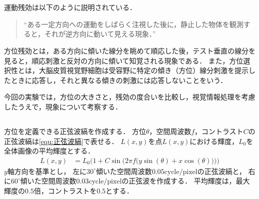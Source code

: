 \chapter{\kadaic}
\section{\purpose}
運動残効は以下のように説明されている．
\begin{quote}
    ``ある一定方向への運動をしばらく注視した後に，静止した物体を観測すると，それが逆方向に動いて見える現象．''\\
    \hfill\cite[p.58]{認知心理学辞典}
\end{quote}
方位残効とは，ある方向に傾いた線分を眺めて順応した後，テスト垂直の線分を見ると，順応刺激と反対の方向に傾いて知覚される現象である\cite[p.5]{方位残効と運動残効のメカニズム}．
また，方位選択性とは，大脳皮質視覚野細胞は受容野に特定の傾き（方位）線分刺激を提示したときに応答し，それと異なる傾きの刺激には応答しないことをいう\cite[p.764]{認知心理学辞典}．\par
今回の実験では，方位の大きさと，残効の度合いを比較し，視覚情報処理を考慮したうえで，現象について考察する．
\section{\method}
\paragraph{\kadaica}
方位を定義できる正弦波縞を作成する．
方位\(\theta\)，空間周波数\(f\)，コントラスト\(C\)の正弦波縞は\eqref{equ:正弦波縞}で表せる．
\(L(x,y)\)を点\(L(x,y)\)における輝度，\(L_0\)を全体画像の平均輝度とする．
\begin{align}
    L(x,y) & = L_0\Bigg(1+C\sin\Big(2\pi f\big(y\sin(\theta)+x\cos(\theta)\big)\Big)\Bigg)\label{equ:正弦波縞}
\end{align}
\(y\)軸方向を基準とし，
左に\(30^\circ\)傾いた空間周波数\(0.05\textrm{cycle}/\textrm{pixel}\)の正弦波縞と，
右に\(60^{\circ}\)傾いた空間周波数\(0.03\textrm{cycle}/\textrm{pixel}\)の正弦波を作成する．
平均輝度は，最大輝度の\(0.5\)倍，コントラストを\(0.5\)とする．
